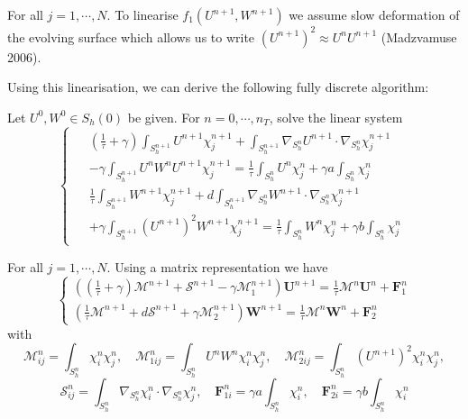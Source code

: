 \documentclass[notheorems,serif]{beamer}
\begin{document}
\begin{frame}
For all $j=1,\cdots,N$. To linearise $f_1(U^{n+1}, W^{n+1})$ we assume slow deformation of the evolving surface which allows us to write $(U^{n+1})^2\approx U^nU^{n+1}$ (Madzvamuse 2006).

Using this linearisation, we can derive the following fully discrete algorithm:

Let $U^0, W^0\in S_h(0)$ be given. For $n=0,\cdots,n_T$, solve the linear system
\begin{equation*}
\begin{cases}
\begin{aligned}
&(\frac{1}{\tau}+\gamma)\int_{S_h^{n+1}}U^{n+1}\chi_j^{n+1}+\int_{S_h^{n+1}}\nabla_{S_h^n}U^{n+1}\cdot\nabla_{S_h^n}\chi_j^{n+1}\\
&-\gamma\int_{S_h^{n+1}}U^nW^nU^{n+1}\chi_j^{n+1}=\frac{1}{\tau}\int_{S_h^n}U^n \chi_j^n + \gamma a\int_{S_h^n}\chi_j^{n}\\
&\frac{1}{\tau}\int_{S_h^{n+1}}W^{n+1}\chi_j^{n+1}+d\int_{S_h^{n+1}}\nabla_{S_h^n}W^{n+1}\cdot\nabla_{S_h^n}\chi_j^{n+1}\\
&+\gamma\int_{S_h^{n+1}}(U^{n+1})^2W^{n+1}\chi_j^{n+1}=\frac{1}{\tau}\int_{S_h^n}W^n\chi_j^n+\gamma b\int_{S_h^n}\chi_j^n
\end{aligned}
\end{cases}
\end{equation*}
\end{frame}

\begin{frame}
For all $j=1,\cdots,N$. Using a matrix representation we have
\begin{equation*}
\begin{cases}
\left(\left(\frac{1}{\tau}+\gamma\right)\mathcal{M}^{n+1}+\mathcal{S}^{n+1}-\gamma\mathcal{M}_1^{n+1}\right)\boldsymbol{U}^{n+1}=\frac{1}{\tau}\mathcal{M}^n\boldsymbol{U}^n+\boldsymbol{F}_1^n\\
\left(\frac{1}{\tau}\mathcal{M}^{n+1}+d\mathcal{S}^{n+1}+\gamma\mathcal{M}_2^{n+1}\right)\boldsymbol{W}^{n+1}=\frac{1}{\tau}\mathcal{M}^n\boldsymbol{W}^n+\boldsymbol{F}_2^n
\end{cases}
\end{equation*}
with
\begin{equation*}
\mathcal{M}_{ij}^n=\int_{S_h^n}\chi_i^n\chi_j^n,\quad\mathcal{M}_{1ij}^n=\int_{S_h^n}U^nW^n\chi_i^n\chi_j^n,\quad\mathcal{M}_{2ij}^n=\int_{S_h^n}(U^{n+1})^2\chi_i^n\chi_j^n,
\end{equation*}
\begin{equation*}
\mathcal{S}_{ij}^n=\int_{S_h^n}\nabla_{S_h^n}\chi_i^n\cdot\nabla_{S_h^n}\chi_j^n,\quad\boldsymbol{F}_{1i}^n=\gamma a\int_{S_h^n}\chi_i^n,\quad\boldsymbol{F}_{2i}^n=\gamma b\int_{S_h^n}\chi_i^n
\end{equation*}
\end{frame}
\end{document}
